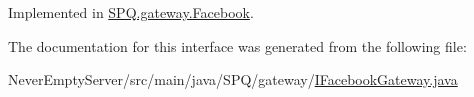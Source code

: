 Implemented in \mbox{\hyperlink{class_s_p_q_1_1gateway_1_1_facebook_aba03bc89c530d3f2159b3a1eb65c3427}{S\+P\+Q.\+gateway.\+Facebook}}.



The documentation for this interface was generated from the following file\+:\begin{DoxyCompactItemize}
\item 
Never\+Empty\+Server/src/main/java/\+S\+P\+Q/gateway/\mbox{\hyperlink{_i_facebook_gateway_8java}{I\+Facebook\+Gateway.\+java}}\end{DoxyCompactItemize}
